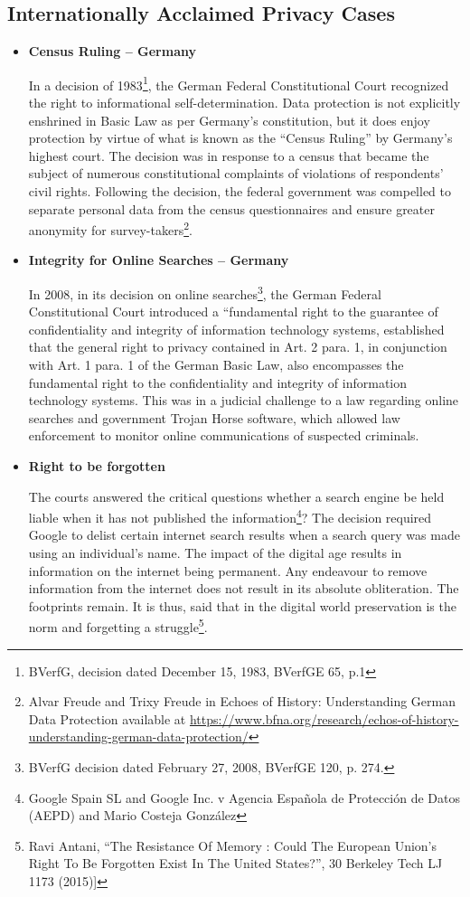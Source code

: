 \begin{multicols}{2}
\section{Internationally Acclaimed Privacy Cases}

\begin{itemize}

\item[{\bf 1.}] \textbf{Census Ruling – Germany}

In a decision of 1983\footnote{BVerfG, decision dated December 15, 1983, BVerfGE 65, p.1}, the German Federal Constitutional Court recognized the right to informational self-determination. Data protection is not explicitly enshrined in Basic Law as per Germany’s constitution, but it does enjoy protection by virtue of what is known as the “Census Ruling” by Germany’s highest court. The decision was in response to a census that became the subject of numerous constitutional complaints of violations of respondents’ civil rights. Following the decision, the federal government was compelled to separate personal data from the census questionnaires and ensure greater anonymity for survey-takers\footnote{Alvar Freude and Trixy Freude in Echoes of History: Understanding German Data Protection available at \url{https://www.bfna.org/research/echos-of-history-understanding-german-data-protection/}}.

\item[{\bf 2.}] \textbf{Integrity for Online Searches – Germany}

In 2008, in its decision on online searches\footnote{BVerfG decision dated February 27, 2008, BVerfGE 120, p. 274.}, the German Federal Constitutional Court introduced a “fundamental right to the guarantee of confidentiality and integrity of information technology systems, established that the general right to privacy contained in Art. 2 para. 1, in conjunction with Art. 1 para. 1 of the German Basic Law, also encompasses the fundamental right to the confidentiality and integrity of information technology systems. This was in a judicial challenge to a law regarding online searches and government Trojan Horse software, which allowed law enforcement to monitor online communications of suspected criminals.

\item[{\bf 3.}] \textbf{Right to be forgotten}

The courts answered the critical questions whether a search engine be held liable when it has not published the information\footnote{Google Spain SL and Google Inc. v Agencia Española de Protección de Datos (AEPD) and Mario Costeja González}? The decision required Google to delist certain internet search results when a search query was made using an individual’s name. The impact of the digital age results in information on the internet being permanent. Any endeavour to remove information from the internet does not result in its absolute obliteration. The footprints remain. It is thus, said that in the digital world preservation is the norm and forgetting a struggle\footnote{Ravi Antani, “The Resistance Of Memory : Could The European Union's Right To Be Forgotten Exist In The United States?”, 30 Berkeley Tech LJ 1173 (2015)]}.


\end{itemize}
\end{multicols}
